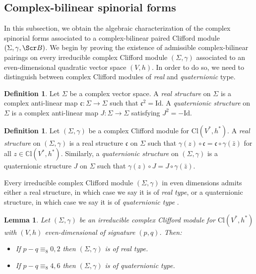 \documentclass[10pt,a4paper,twoside,reqno]{amsart}
\theoremstyle{plain}
\newtheorem{lemma}[thm]{Lemma}
\theoremstyle{definition}
\newtheorem{definition}[thm]{Definition}
\theoremstyle{remark}
\def\C{\mathbb{C}}
\def\Id{\mathrm{Id}}
\def\scB{\Scr B}
\def\Cl{\mathrm{Cl}}
\def\frc{\mathfrak{F}}
\def\frc{\mathfrak{c}}
\begin{document}
\subsection{Complex-bilinear spinorial forms}
\label{subsec:bilinear}


In this subsection, we obtain the algebraic characterization of the complex spinorial forms associated to a complex-bilinear paired Clifford module $(\Sigma,\gamma,\scB)$. We begin by proving the existence of admissible complex-bilinear pairings on every irreducible complex Clifford module $(\Sigma,\gamma)$ associated to an even-dimensional quadratic vector space $(V,h)$. In order to do so, we need to distinguish between complex Clifford modules of \emph{real} and \emph{quaternionic} type.

\begin{definition}
Let $\Sigma$ be a complex vector space. A \emph{real structure} on $\Sigma$ is a complex anti-linear map $\frc \colon \Sigma \to \Sigma$ such that $\frc^2 = \Id$. A \emph{quaternionic structure} on $\Sigma$ is a complex anti-linear map $J\colon\Sigma\to\Sigma$ satisfying $J^2=-\Id$. 
\end{definition}

\begin{definition}
Let $(\Sigma,\gamma)$ be a complex Clifford module for $\Cl(V^*,h^*)$. A \emph{real structure} on $(\Sigma,\gamma)$ is a real structure $\frc$ on $\Sigma$ such that $\gamma(z) \circ \frc = \frc\circ \gamma(\bar z)$ for all $z\in\C\mathrm{l}(V^*,h^*)$. Similarly, a \emph{quaternionic structure} on $(\Sigma,\gamma)$ is a quaternionic structure $J$ on $\Sigma$ such that $\gamma(z) \circ J = J \circ \gamma(\bar z)$. 
\end{definition}

\noindent
Every irreducible complex Clifford module $(\Sigma,\gamma)$ in even dimensions admits either a real structure, in which case we say it is of \emph{real type}, or a quaternionic structure, in which case we say it is of \emph{quaternionic type} \cite{HarveyBook}.

\begin{lemma}\label{lemma:real_or_quaternionic_type}
Let $(\Sigma,\gamma)$ be an irreducible complex Clifford module for $\Cl(V^*,h^*)$ with $(V,h)$ even-dimensional of signature $(p,q)$. Then:
\begin{itemize}
    \item If $p-q\equiv_8 0,2$ then $(\Sigma,\gamma)$ is of real type.
    \item If $p-q\equiv_8 4,6$ then $(\Sigma,\gamma)$ is of quaternionic type.
\end{itemize}
\end{lemma}
\end{document}
